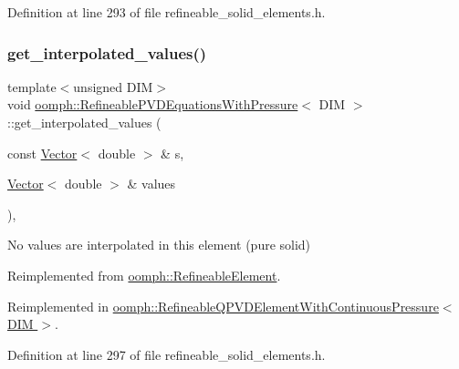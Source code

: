 Definition at line 293 of file refineable\+\_\+solid\+\_\+elements.\+h.

\mbox{\label{classoomph_1_1RefineablePVDEquationsWithPressure_a4e4bd0c67eaefb3f34a0744d17d07567}} 
\subsubsection{\texorpdfstring{get\+\_\+interpolated\+\_\+values()}{get\_interpolated\_values()}\hspace{0.1cm}{\footnotesize\ttfamily [2/2]}}
{\footnotesize\ttfamily template$<$unsigned D\+IM$>$ \\
void \hyperlink{classoomph_1_1RefineablePVDEquationsWithPressure}{oomph\+::\+Refineable\+P\+V\+D\+Equations\+With\+Pressure}$<$ D\+IM $>$\+::get\+\_\+interpolated\+\_\+values (\begin{DoxyParamCaption}\item[{const \hyperlink{classoomph_1_1Vector}{Vector}$<$ double $>$ \&}]{s,  }\item[{\hyperlink{classoomph_1_1Vector}{Vector}$<$ double $>$ \&}]{values }\end{DoxyParamCaption})\hspace{0.3cm}{\ttfamily [inline]}, {\ttfamily [virtual]}}



No values are interpolated in this element (pure solid) 



Reimplemented from \hyperlink{classoomph_1_1RefineableElement_ad9a4f92880668a2373326d8306365c43}{oomph\+::\+Refineable\+Element}.



Reimplemented in \hyperlink{classoomph_1_1RefineableQPVDElementWithContinuousPressure_aa30cbff68622fc6db42a85ce0afa3e77}{oomph\+::\+Refineable\+Q\+P\+V\+D\+Element\+With\+Continuous\+Pressure$<$ D\+I\+M $>$}.



Definition at line 297 of file refineable\+\_\+solid\+\_\+elements.\+h.

